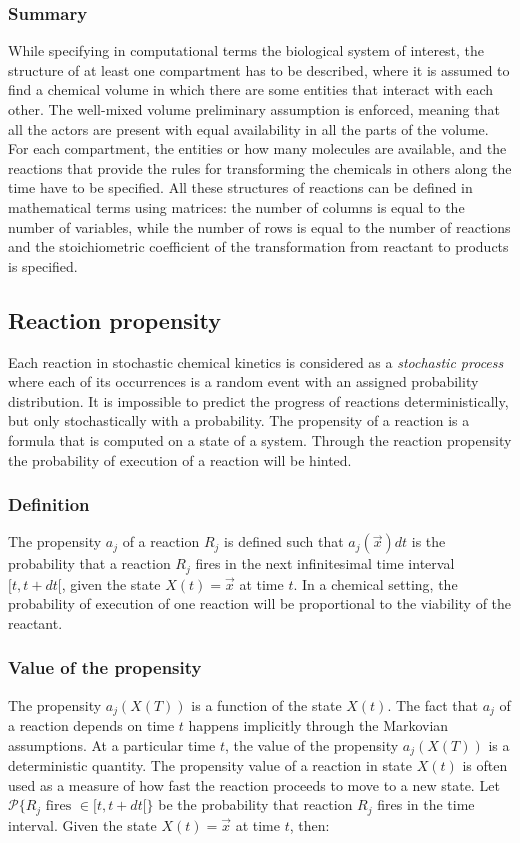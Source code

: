     \subsubsection{Summary}
    While specifying in computational terms the biological system of interest, the structure of at least one compartment has to be described, where it is assumed to find a chemical volume in which there are some entities that interact with each other.
    The well-mixed volume preliminary assumption is enforced, meaning that all the actors are present with equal availability in all the parts of the volume.
    For each compartment, the entities or how many molecules are available, and the reactions that provide the rules for transforming the chemicals in others along the time have to be specified.
    All these structures of reactions can be defined in mathematical terms using matrices: the number of columns is equal to the number of variables, while the number of rows is equal to the number of reactions and the stoichiometric coefficient of the transformation from reactant to products is specified.

  \subsection{Reaction propensity}
  Each reaction in stochastic chemical kinetics is considered as a \emph{stochastic process} where each of its occurrences is a random event with an assigned probability distribution.
  It is impossible to predict the progress of reactions deterministically, but only stochastically with a probability.
  The propensity of a reaction is a formula that is computed on a state of a system.
  Through the reaction propensity the probability of execution of a reaction will be hinted.

    \subsubsection{Definition}
    The propensity $a_j$ of a reaction $R_j$ is defined such that $a_j(\vec{x})dt$ is the probability that a reaction $R_j$ fires in the next infinitesimal time interval $[t, t+dt[$, given the state $X(t) = \vec{x}$ at time $t$.
  In a chemical setting, the probability of execution of one reaction will be proportional to the viability of the reactant.

    \subsubsection{Value of the propensity}
    The propensity $a_j(X(T))$ is a function of the state $X(t)$.
    The fact that $a_j$ of a reaction depends on time $t$ happens implicitly through the Markovian assumptions.
    At a particular time $t$, the value of the propensity $a_j(X(T))$ is a deterministic quantity.
    The propensity value of a reaction in state $X(t)$ is often used as a measure of how fast the reaction proceeds to move to a new state.
    Let $\mathcal{P}\{R_j\text{ fires }\in [t,t+dt[\}$ be the probability that reaction $R_j$ fires in the time interval.
    Given the state $X(t)=\vec{x}$ at time $t$, then:

